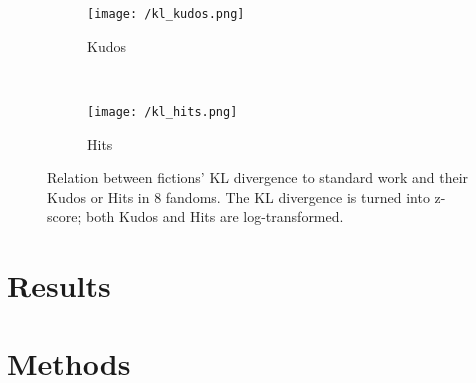 \documentclass[11pt]{article} %
\begin{document}
\begin{figure*}[t!]
    \centering
    \begin{subfigure}[t]{0.7\textwidth}
        \centering
        \texttt{[image: /kl\_kudos.png]}
        \caption{Kudos}
    \end{subfigure}%
    ~ 
    \begin{subfigure}[t]{0.3\textwidth}
        \centering
        \texttt{[image: /kl\_hits.png]}
        \caption{Hits}
    \end{subfigure}
    \caption{Relation between fictions' KL divergence to standard work and their Kudos or Hits in 8 fandoms. The KL divergence is turned into z-score; both Kudos and Hits are log-transformed. }
    \label{fig:kl_fields}
\end{figure*}







\section{Results} %
\label{sec:results}


\section{Methods} %
\label{sec:methods}


\printbibliography
    
\end{document}
